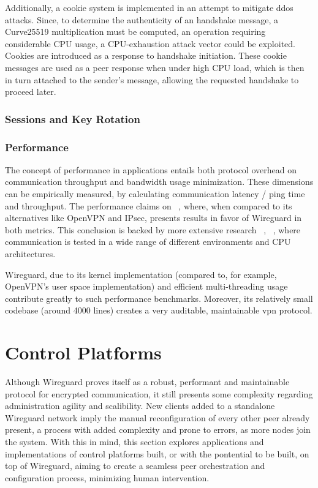 \documentclass[11pt,twoside,a4paper]{report}
\begin{document}
Additionally, a cookie system is implemented in an attempt to mitigate \acrshort{ddos} attacks. Since, to determine the authenticity of an handshake message, a Curve25519 multiplication must be computed,  an operation requiring considerable CPU usage, a CPU-exhaustion attack vector could be exploited. Cookies are introduced as a response to handshake initiation. These cookie messages are used as a peer response when under high CPU load, which is then in turn attached to the sender's message, allowing the requested handshake to proceed later.

\subsubsection{Sessions and Key Rotation}

\subsubsection{Performance}

The concept of performance in  applications entails both protocol overhead on communication throughput and bandwidth usage minimization. These dimensions can be empirically measured, by calculating communication latency / ping time and throughput. The performance claims on ~\cite{donenfeld2017wireguard}, where, when compared to its alternatives like OpenVPN and IPsec, presents results in favor of Wireguard in both metrics. This conclusion is backed by more extensive research ~\cite{mackey2020performance}, ~\cite{osswald2020performance}, where communication is tested in a wide range of different environments and CPU architectures.

Wireguard, due to its kernel implementation (compared to, for example, OpenVPN's user space implementation) and efficient multi-threading usage contribute greatly to such performance benchmarks. Moreover, its relatively small codebase (around 4000 lines) creates a very auditable, maintainable \acrshort{vpn} protocol.


\section{Control Platforms}

Although Wireguard proves itself as a robust, performant and maintainable protocol for encrypted communication, it still presents some complexity regarding administration agility and scalibility. New clients added to a standalone Wireguard network imply the manual reconfiguration of every other peer already present, a process with added complexity and prone to errors, as more nodes join the system. With this in mind, this section explores applications and implementations of control platforms built, or with the pontential to be built, on top of Wireguard, aiming to create a seamless peer orchestration and configuration process, minimizing human intervention.
\end{document}
